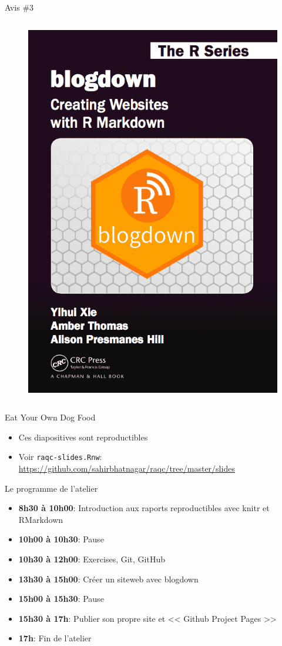 \documentclass[10pt]{beamer}\usepackage[]{graphicx}\usepackage[]{color}
\begin{document}
\begin{frame}{Avis \#3}
\begin{columns}[c]
\begin{figure}
\includegraphics[width=0.6\columnwidth]{blogdown.png}
\end{figure}
\end{columns}

\end{frame}


\begin{frame}{Eat Your Own Dog Food}

\begin{itemize}
\item Ces diapositives sont reproductibles
\item Voir \texttt{raqc-slides.Rnw}: \href{https://github.com/sahirbhatnagar/raqc/tree/master/slides}{https://github.com/sahirbhatnagar/raqc/tree/master/slides}
\end{itemize}

\end{frame}



\begin{frame}{Le programme de l'atelier}
\begin{itemize}
\item \textbf{8h30 à 10h00}: Introduction aux raports reproductibles avec knitr et RMarkdown
\item \textbf{10h00 à 10h30}: Pause
\item \textbf{10h30 à 12h00}: Exercises, Git, GitHub
\item \textbf{13h30 à 15h00}: Créer un siteweb avec blogdown
\item \textbf{15h00 à 15h30}: Pause
\item \textbf{15h30 à 17h}: Publier son propre site et << Github Project Pages >>
\item \textbf{17h}: Fin de l'atelier
\end{itemize}
\end{frame}
\end{document}
